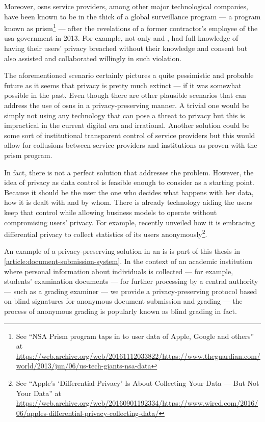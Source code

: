 \documentclass[showtrims,oldfontcommands]{kthesis}
\begin{document}
Moreover, \acp{osn} service providers, among other major technological companies, 
have been known to be in the thick of a global surveillance program --- a program 
known as \Ac{prism}\footnote{See ``NSA Prism program taps in to user data of Apple, Google and others'' at \url{https://web.archive.org/web/20161112033822/https://www.theguardian.com/world/2013/jun/06/us-tech-giants-nsa-data}} --- 
after the revelations of a former contractor's employee of the \ac{usa} government 
in 2013. For example, not only \Facebook and \Google, had full knowledge of having 
their users' privacy breached without their knowledge and consent but also assisted 
and collaborated willingly in such violation.

The aforementioned scenario certainly pictures a quite pessimistic and probable 
future as it seems that privacy is pretty much extinct --- if it was somewhat possible 
in the past. Even though there are other plausible scenarios that can address the 
use of \acp{osn} in a privacy-preserving manner. A trivial one would be simply not 
using any technology that can pose a threat to privacy but this is impractical in 
the current digital era and irrational. Another solution could be some sort of institutional 
transparent control of service providers but this would allow for collusions between 
service providers and institutions as proven with the \ac{prism} program.

In fact, there is not a perfect solution that addresses the problem. However, the 
idea of privacy as data control is feasible enough to consider as a starting point. 
Because it should be the user the one who decides what happens with her data, how 
it is dealt with and by whom. There is already technology aiding the users keep 
that control while allowing business models to operate without compromising users' 
privacy. For example, \Apple recently unveiled how it is embracing differential 
privacy to collect statistics of its users anonymously\footnote{See ``Apple's `Differential Privacy' Is About Collecting Your Data --- But Not Your Data'' at \url{https://web.archive.org/web/20160901192334/https://www.wired.com/2016/06/apples-differential-privacy-collecting-data/}}.

An example of a privacy-preserving solution in an \ac{is} is part of 
this thesis in \cref{article:document-submission-system}. In the context of an academic 
institution where personal information about individuals is collected --- for example, 
students' examination documents --- for further processing by a central authority 
--- such as a grading examiner --- we provide a privacy-preserving protocol based 
on blind signatures for anonymous document submission and grading --- the process 
of anonymous grading is popularly known as blind grading in fact. 
\end{document}
